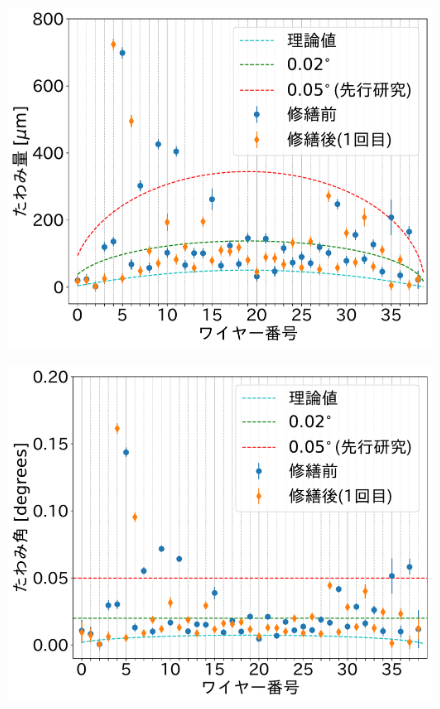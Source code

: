 \documentclass[../../main.tex]{subfiles}
\begin{document}
\begin{figure}[H]
    \begin{minipage}[b]{0.5\hsize}
        \centering
        \includegraphics[width=1.0\textwidth]{wiresag_swg/swg_sag_comparison.pdf}
        \subcaption{}
        \label{fig:wiresag_swg_sag_result_repair}
    \end{minipage}
    \begin{minipage}[b]{0.5\hsize}
        \centering
        \includegraphics[width=1.0\textwidth]{wiresag_swg/swg_sag_angle_comparison.pdf}

\end{minipage}
\end{figure}
\end{document}
